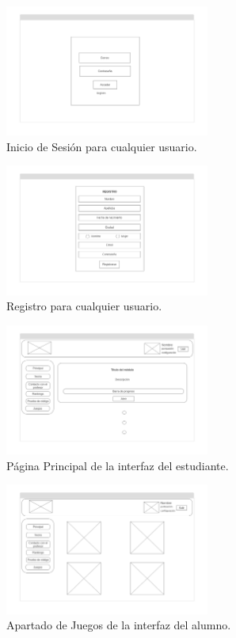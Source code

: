 \begin{figure}[H]
    \centering
    \includegraphics[width=0.6\textwidth]{imagenes/Mockups/1-InicioDeSesion.png}
    \caption{Inicio de Sesión para cualquier usuario.}
\end{figure}

\begin{figure}[H]
    \centering
    \includegraphics[width=0.6\textwidth]{imagenes/Mockups/2-Registro.png}
    \caption{Registro para cualquier usuario.}
\end{figure}

\begin{figure}[H]
    \centering
    \includegraphics[width=0.6\textwidth]{imagenes/Mockups/3-Pag-Principal.png}
    \caption{Página Principal  de la interfaz del estudiante.}
\end{figure}

\begin{figure}[H]
    \centering
    \includegraphics[width=0.6\textwidth]{imagenes/Mockups/4-Juegos.png}
    \caption{Apartado de Juegos de la interfaz del alumno.}
\end{figure}

